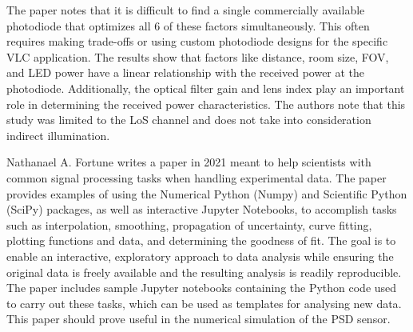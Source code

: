 The paper notes that it is difficult to find a single commercially available photodiode that optimizes all 6 of these factors simultaneously. 
This often requires making trade-offs or using custom photodiode designs for the specific VLC application.
The results show that factors like distance, room size, FOV, and LED power have a linear relationship with the received power at the photodiode. 
Additionally, the optical filter gain and lens index play an important role in determining the received power characteristics.
The authors note that this study was limited to the LoS channel and does not take into consideration indirect illumination\cite{RefWorks:2017analysis}.

Nathanael A. Fortune writes a paper in 2021 meant to help scientists with common signal processing tasks when handling experimental data. 
The paper provides examples of using the Numerical Python (Numpy) and Scientific Python (SciPy) packages, as well as interactive Jupyter Notebooks, to accomplish tasks such as interpolation, smoothing, propagation of uncertainty, curve fitting, plotting functions and data, and determining the goodness of fit. 
The goal is to enable an interactive, exploratory approach to data analysis while ensuring the original data is freely available and the resulting analysis is readily reproducible. 
The paper includes sample Jupyter notebooks containing the Python code used to carry out these tasks, which can be used as templates for analysing new data\cite{RefWorks:fortune2021short}. 
This paper should prove useful in the numerical simulation of the PSD sensor.